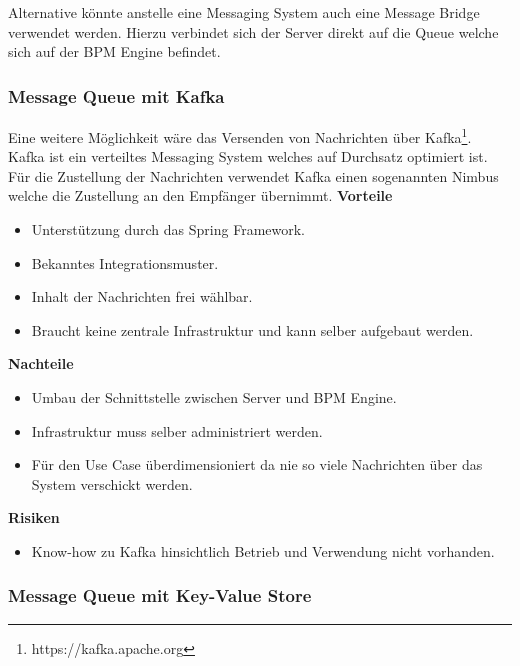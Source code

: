 Alternative könnte anstelle eine Messaging System auch eine Message Bridge verwendet werden. Hierzu verbindet sich der Server direkt auf die Queue welche sich auf der BPM Engine befindet.

\subsubsection{Message Queue mit Kafka}

Eine weitere Möglichkeit wäre das Versenden von Nachrichten über Kafka\footnote{https://kafka.apache.org}. Kafka ist ein verteiltes Messaging System welches auf Durchsatz optimiert ist. Für die Zustellung der Nachrichten verwendet Kafka einen sogenannten Nimbus welche die Zustellung an den Empfänger übernimmt.
\newline
\newline
\textbf{Vorteile}
\begin{itemize}
	\item Unterstützung durch das Spring Framework.
	\item Bekanntes Integrationsmuster.
	\item Inhalt der Nachrichten frei wählbar.
	\item Braucht keine zentrale Infrastruktur und kann selber aufgebaut werden.
\end{itemize}
\textbf{Nachteile}
\begin{itemize}
	\item Umbau der Schnittstelle zwischen Server und BPM Engine.
	\item Infrastruktur muss selber administriert werden.
	\item Für den Use Case überdimensioniert da nie so viele Nachrichten über das System verschickt werden.
\end{itemize}
\textbf{Risiken}
\begin{itemize}
	\item Know-how zu Kafka hinsichtlich Betrieb und Verwendung nicht vorhanden.
\end{itemize}

\subsubsection{Message Queue mit Key-Value Store}

